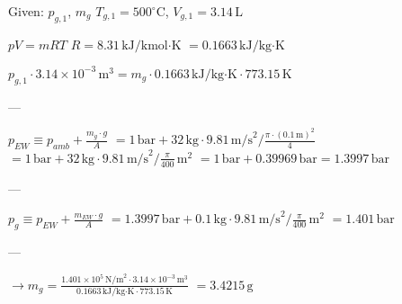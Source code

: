 Given: \( p_{g,1} \), \( m_g \)  
\( T_{g,1} = 500^\circ \text{C} \), \( V_{g,1} = 3.14 \, \text{L} \)  

\( pV = mRT \)  
\( R = 8.31 \, \text{kJ} / \text{kmol·K} \)  
\( = 0.1663 \, \text{kJ} / \text{kg·K} \)  

\( p_{g,1} \cdot 3.14 \times 10^{-3} \, \text{m}^3 = m_g \cdot 0.1663 \, \text{kJ} / \text{kg·K} \cdot 773.15 \, \text{K} \)  

---

\( p_{EW} \equiv p_{amb} + \frac{m_g \cdot g}{A} \)  
\( = 1 \, \text{bar} + 32 \, \text{kg} \cdot 9.81 \, \text{m/s}^2 / \frac{\pi \cdot (0.1 \, \text{m})^2}{4} \)  
\( = 1 \, \text{bar} + 32 \, \text{kg} \cdot 9.81 \, \text{m/s}^2 / \frac{\pi}{400} \, \text{m}^2 \)  
\( = 1 \, \text{bar} + 0.39969 \, \text{bar} = 1.3997 \, \text{bar} \)  

---

\( p_{g} \equiv p_{EW} + \frac{m_{EW} \cdot g}{A} \)  
\( = 1.3997 \, \text{bar} + 0.1 \, \text{kg} \cdot 9.81 \, \text{m/s}^2 / \frac{\pi}{400} \, \text{m}^2 \)  
\( = 1.401 \, \text{bar} \)  

---

\( \rightarrow m_g = \frac{1.401 \times 10^5 \, \text{N/m}^2 \cdot 3.14 \times 10^{-3} \, \text{m}^3}{0.1663 \, \text{kJ/kg·K} \cdot 773.15 \, \text{K}} \)  
\( = 3.4215 \, \text{g} \)